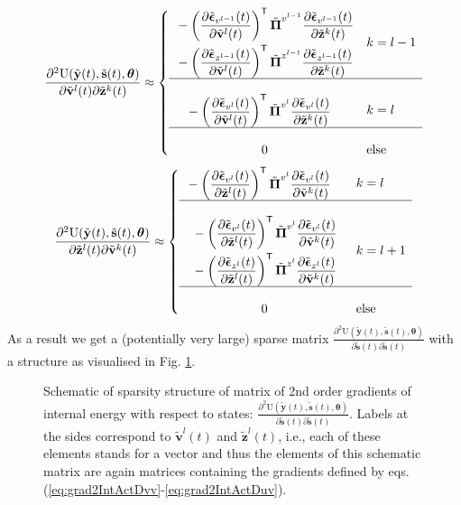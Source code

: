 \documentclass[a4paper,10pt]{article}
\newcommand{\bs}[1]{\mathbf{#1}}					%
\newcommand{\bgs}[1]{\boldsymbol{#1}}				%
\newcommand{\pd}[2]{\frac{\partial #1}{\partial #2}} 	%
\newcommand{\ppd}[3]{\frac{\partial^2 #1}{\partial #2 \partial #3}} %
\newcommand{\tr}{\mathsf{T}}				%
\newcommand{\eq}[1]{\begin{equation} #1 \end{equation}}%
\newcommand{\gc}[1]{\tilde{#1}} %
\renewcommand{\ss}{z}         %
\newcommand{\sv}{v}         %
\newcommand{\so}{y}         %
\newcommand{\st}{s}         %
\newcommand{\spe}{\epsilon} %
\renewcommand{\sp}{\theta}    %
\newcommand{\ps}{\bs{\ss}}    %
\newcommand{\pv}{\bs{\sv}}    %
\newcommand{\po}{\bs{\so}}    %
\newcommand{\pt}{\bs{\st}}     %
\newcommand{\ppe}{\bgs{\spe}} %
\newcommand{\psg}{\gc{\ps}}    %
\newcommand{\pvg}{\gc{\pv}}    %
\newcommand{\ptg}{\gc{\pt}}     %
\newcommand{\pog}{\gc{\po}}    %
\newcommand{\ppeg}{\gc{\ppe}} %
\newcommand{\pp}{\bgs{\sp}} %
\newcommand{\U}{\mathrm{U}}			%
\newcommand{\Prec}{\bgs{\Pi}}			%
\begin{document}
\eq{
    \ppd{\U(\pog(t),\ptg(t),\pp)}{\pvg^l(t)}{\psg^k(t)} \approx \left\{\begin{array}{cl}
         \begin{split}&- \left(\pd{\ppeg_{\sv^{l-1}}(t)}{\pvg^l(t)}\right)^\tr\gc{\Prec}^{\sv^{l-1}}\pd{\ppeg_{\sv^{l-1}}(t)}{\psg^k(t)}\\ &- \left(\pd{\ppeg_{\ss^{l-1}}(t)}{\pvg^l(t)}\right)^\tr\gc{\Prec}^{\ss^{l-1}}\pd{\ppeg_{\ss^{l-1}}(t)}{\psg^k(t)}\end{split} & k=l-1\\
         \hline\\
         \begin{split} &- \left(\pd{\ppeg_{\sv^{l}}(t)}{\pvg^l(t)}\right)^\tr\gc{\Prec}^{\sv^{l}}\pd{\ppeg_{\sv^{l}}(t)}{\psg^k(t)}\end{split} & k=l\\
         \hline\\
         0 & \mathrm{else}\end{array} \right.
}
\eq{\label{eq:grad2IntActDuv}
    \ppd{\U(\pog(t),\ptg(t),\pp)}{\psg^l(t)}{\pvg^k(t)} \approx \left\{\begin{array}{cl}
         \begin{split}&- \left(\pd{\ppeg_{\sv^{l}}(t)}{\psg^l(t)}\right)^\tr\gc{\Prec}^{\sv^{l}}\pd{\ppeg_{\sv^{l}}(t)}{\pvg^k(t)}\end{split} & k=l\\
      \hline\\
         \begin{split} &- \left(\pd{\ppeg_{\sv^{l}}(t)}{\psg^l(t)}\right)^\tr\gc{\Prec}^{\sv^{l}}\pd{\ppeg_{\sv^{l}}(t)}{\pvg^k(t)}\\ &- \left(\pd{\ppeg_{\ss^{l}}(t)}{\psg^l(t)}\right)^\tr\gc{\Prec}^{\ss^{l}}\pd{\ppeg_{\ss^{l}}(t)}{\pvg^k(t)}\end{split} & k=l+1\\
         \hline\\
         0 & \mathrm{else}\end{array} \right.
}
As a result we get a (potentially very large) sparse matrix $\ppd{\U(\pog(t),\ptg(t),\pp)}{\ptg(t)}{\ptg(t)}$ with a structure as visualised in Fig. \ref{fig:stateGrads}.

\begin{figure}
    \centering
    \def\svgwidth{.5\textwidth}
    
    \caption{Schematic of sparsity structure of matrix of 2nd order gradients of internal energy with respect to states: $\ppd{\U(\pog(t),\ptg(t),\pp)}{\ptg(t)}{\ptg(t)}$. Labels at the sides correspond to $\pvg^l(t)$ and $\psg^l(t)$, i.e., each of these elements stands for a vector and thus the elements of this schematic matrix are again matrices containing the gradients defined by eqs. (\ref{eq:grad2IntActDvv}-\ref{eq:grad2IntActDuv}).}
    \label{fig:stateGrads}
\end{figure}
\end{document}
